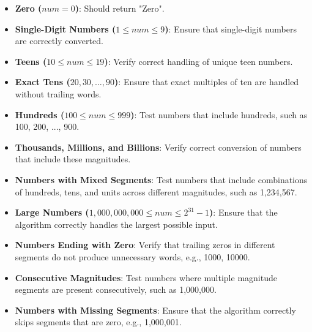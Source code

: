 \begin{itemize}
    \item \textbf{Zero (\(num = 0\))}: Should return "Zero".
    
    \item \textbf{Single-Digit Numbers (\(1 \leq num \leq 9\))}: Ensure that single-digit numbers are correctly converted.
    
    \item \textbf{Teens (\(10 \leq num \leq 19\))}: Verify correct handling of unique teen numbers.
    
    \item \textbf{Exact Tens (\(20, 30, \dots, 90\))}: Ensure that exact multiples of ten are handled without trailing words.
    
    \item \textbf{Hundreds (\(100 \leq num \leq 999\))}: Test numbers that include hundreds, such as 100, 200, ..., 900.
    
    \item \textbf{Thousands, Millions, and Billions}: Verify correct conversion of numbers that include these magnitudes.
    
    \item \textbf{Numbers with Mixed Segments}: Test numbers that include combinations of hundreds, tens, and units across different magnitudes, such as 1,234,567.
    
    \item \textbf{Large Numbers (\(1,000,000,000 \leq num \leq 2^{31} - 1\))}: Ensure that the algorithm correctly handles the largest possible input.
    
    \item \textbf{Numbers Ending with Zero}: Verify that trailing zeros in different segments do not produce unnecessary words, e.g., 1000, 10000.
    
    \item \textbf{Consecutive Magnitudes}: Test numbers where multiple magnitude segments are present consecutively, such as 1,000,000.
    
    \item \textbf{Numbers with Missing Segments}: Ensure that the algorithm correctly skips segments that are zero, e.g., 1,000,001.
    

\end{itemize}
